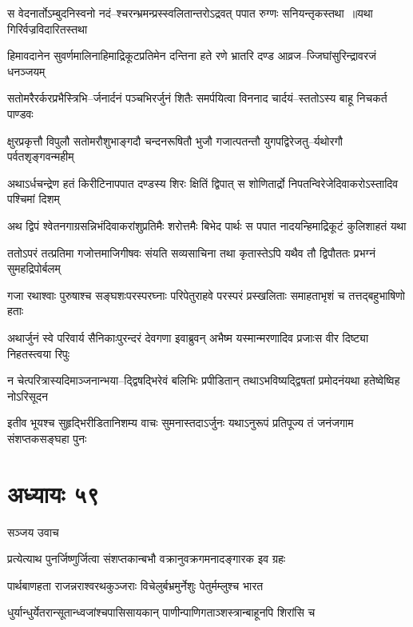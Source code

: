 \twolineshloka
{स वेदनार्तोऽम्बुदनिस्वनो नदं--श्चरन्भ्रमन्प्रस्स्वलितान्तरोऽद्रवत्}
{पपात रुग्णः सनियन्तृकस्तथा ॥यथा गिरिर्वज्रविदारितस्तथा}


\twolineshloka
{हिमावदानेन सुवर्णमालिनाहिमाद्रिकूटप्रतिमेन दन्तिना}
{हते रणे भ्रातरि दण्ड आव्रज--ज्जिघांसुरिन्द्रावरजं धनञ्जयम्}


\twolineshloka
{सतोमरैरर्करप्रभैस्त्रिभि--र्जनार्दनं पञ्चभिरर्जुनं शितैः}
{समर्पयित्वा विननाद चार्दयं--स्ततोऽस्य बाहू निचकर्त पाण्डवः}


\twolineshloka
{क्षुरप्रकृत्तौ विपुलौ सतोमरौशुभाङ्गदौ चन्दनरूषितौ भुजौ}
{गजात्पतन्तौ युगपद्विरेजतु--र्यथोरगौ पर्वतशृङ्गवन्महीम्}


\twolineshloka
{अथाऽर्धचन्द्रेण हतं किरीटिनापपात दण्डस्य शिरः क्षितिं द्विपात्}
{स शोणितार्द्रो निपतन्विरेजेदिवाकरोऽस्तादिव पश्चिमां दिशम्}


\twolineshloka
{अथ द्विपं श्वेतनगाग्रसन्निभंदिवाकरांशुप्रतिमैः शरोत्तमैः}
{बिभेद पार्थः स पपात नादयन्हिमाद्रिकूटं कुलिशाहतं यथा}


\twolineshloka
{ततोऽपरं तत्प्रतिमा गजोत्तमाजिगीषवः संयति सव्यसाचिना}
{तथा कृतास्तेऽपि यथैव तौ द्विपौततः प्रभग्नं सुमहद्रिपोर्बलम्}


\twolineshloka
{गजा रथाश्वाः पुरुषाश्च सङ्घशःपरस्परघ्नाः परिपेतुराहवे}
{परस्परं प्रस्खलिताः समाहताभृशं च तत्तद्बहुभाषिणो हताः}


\twolineshloka
{अथार्जुनं स्वे परिवार्य सैनिकाःपुरन्दरं देवगणा इवाब्रुवन्}
{अभैष्म यस्मान्मरणादिव प्रजाःस वीर दिष्ट्या निहतस्त्वया रिपुः}


\twolineshloka
{न चेत्परित्रास्यदिमाञ्जनान्भया--द्द्विषद्भिरेवं बलिभिः प्रपीडितान्}
{तथाऽभविष्यद्द्विषतां प्रमोदनंयथा हतेष्वेष्विह नोऽरिसूदन}


\twolineshloka
{इतीव भूयश्च सुहृद्भिरीडितानिशम्य वाचः सुमनास्तदाऽर्जुनः}
{यथाऽनुरूपं प्रतिपूज्य तं जनंजगाम संशप्तकसङ्घहा पुनः}


\chapter{अध्यायः ५९}
\twolineshloka
{सञ्जय उवाच}
{}


\twolineshloka
{प्रत्येत्याथ पुनर्जिष्णुर्जित्वा संशप्तकान्बभौ}
{वक्रानुवक्रगमनादङ्गारक इव ग्रहः}


\twolineshloka
{पार्थबाणहता राजन्नराश्वरथकुञ्जराः}
{विचेलुर्बभ्रमुर्नेशुः पेतुर्मम्लुश्च भारत}


\twolineshloka
{धुर्यान्धुर्येतरान्सूतान्ध्वजांश्चपासिसायकान्}
{पाणीन्पाणिगताञ्शस्त्रान्बाहूनपि शिरांसि च}


